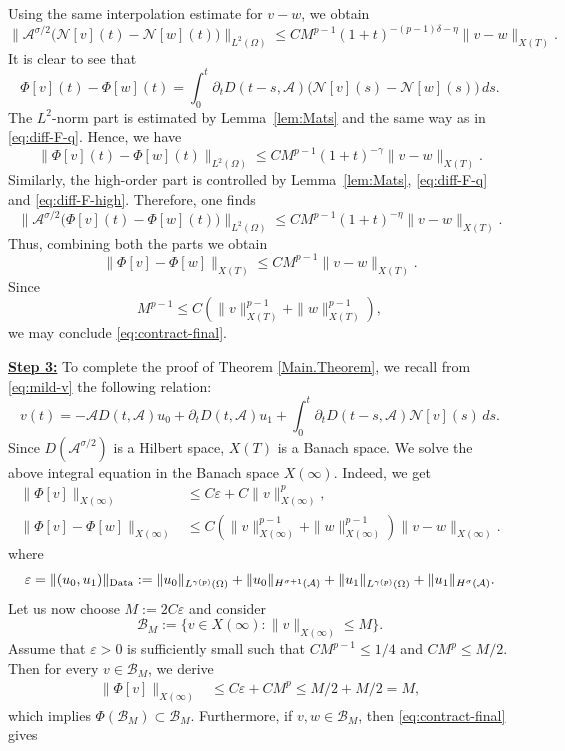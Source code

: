 \documentclass[a4paper,11pt]{article} %
\theoremstyle{remark}
\theoremstyle{definition}
\numberwithin{equation}{section}
\begin{document}
Using the same interpolation estimate for \(v-w\), we obtain
\begin{equation}\label{eq:diff-F-high}
\big\|\mathcal{A}^{\sigma/2}\big(\mathcal{N}[v](t)-\mathcal{N}[w](t)\big)\big\|_{L^2(\Omega)}
\le
CM^{p-1}(1+t)^{-(p-1)\delta-\eta}\|v-w\|_{X(T)}.
\end{equation}
It is clear to see that
\[
\Phi[v](t)-\Phi[w](t)
=
\int_0^t
\partial_tD(t-s,\mathcal{A})
\big(
\mathcal{N}[v](s)-\mathcal{N}[w](s)
\big)
\,ds.
\]
The \(L^2\)-norm part is estimated by Lemma~\ref{lem:Mats} and the same way as in \eqref{eq:diff-F-q}. Hence, we have
\[
\big\|\Phi[v](t)-\Phi[w](t)\big\|_{L^2(\Omega)}
\le
CM^{p-1}
(1+t)^{-\gamma}\|v-w\|_{X(T)}.
\]
Similarly, the high-order part is controlled by Lemma~\ref{lem:Mats}, \eqref{eq:diff-F-q} and \eqref{eq:diff-F-high}. Therefore, one finds
\[
\big\|\mathcal{A}^{\sigma/2}\big(\Phi[v](t)-\Phi[w](t)\big)\big\|_{L^2(\Omega)}
\le
CM^{p-1}(1+t)^{-\eta}
\|v-w\|_{X(T)}.
\]
Thus, combining both the parts we obtain
\[
\big\|\Phi[v]-\Phi[w]\big\|_{X(T)}
\le
CM^{p-1}
\|v-w\|_{X(T)}.
\]
Since
\[
M^{p-1}
\le
C
\left(
\|v\|_{X(T)}^{p-1}
+
\|w\|_{X(T)}^{p-1}
\right),
\]
we may conclude \eqref{eq:contract-final}. \medskip

\noindent\textbf{\underline{Step 3:}} To complete the proof of Theorem \ref{Main.Theorem}, we recall from \eqref{eq:mild-v} the following relation:
$$
v(t)
=
-\mathcal{A}D(t,\mathcal{A})u_0
+
\partial_tD(t,\mathcal{A})u_1
+
\int_0^t
\partial_tD(t-s,\mathcal{A})\mathcal{N}[v](s)\,ds.
$$
Since \(D(\mathcal{A}^{\sigma/2})\) is a Hilbert space, \(X(T)\) is a Banach space. We solve the above integral equation in the Banach space
\(X(\infty)\). Indeed, we get
\begin{align*}
    \big\|\Phi[v]\big\|_{X(\infty)} &\le
C\varepsilon
+
C\|v\|_{X(\infty)}^p, \\
\big\|\Phi[v]-\Phi[w]\big\|_{X(\infty)} &\le C \left(
\|v\|_{X(\infty)}^{p-1} + \|w\|_{X(\infty)}^{p-1} \right) \|v-w\|_{X(\infty)}.
\end{align*}
where
\[
\varepsilon
= \|(u_0, u_1)\|_{\rm Data}:= 
\|u_0\|_{L^{\gamma(p)}(\Omega)}
+
\|u_0\|_{H^{\sigma+1}(\mathcal{A})}
+
\|u_1\|_{L^{\gamma(p)}(\Omega)}
+
\|u_1\|_{H^\sigma(\mathcal{A})}.
\]
Let us now choose $M:=2C\varepsilon$ and consider
\[
\mathcal{B}_M
:=
\{
v\in X(\infty):
\|v\|_{X(\infty)}\le M
\}.
\]
Assume that
\(\varepsilon>0\)
is sufficiently small such that $CM^{p-1}\le 1/4$ and $CM^p\le M/2$. Then for every \(v\in \mathcal{B}_M\), we derive
\begin{align*}
\big\|\Phi[v]\big\|_{X(\infty)}
&
\le
C\varepsilon+CM^p \le
M/2+M/2= M,
\end{align*}
which implies $\Phi(\mathcal{B}_M)\subset \mathcal{B}_M$. Furthermore, if
\(v,w\in \mathcal{B}_M\),
then \eqref{eq:contract-final} gives
\end{document}
